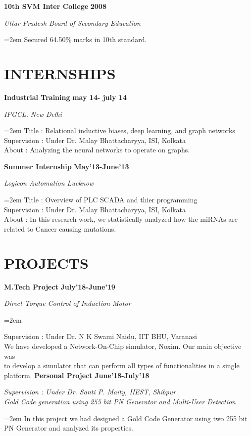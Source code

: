 \documentclass[paper=a4,fontsize=11pt]{scrartcl} %
\newcommand{\sepspace}{\vspace*{1em}}		%
\newcommand{\NewPart}[1]{\section*{\uppercase{#1}}}
\newcommand{\EducationEntry}[4]{
		\noindent \textbf{#1} \hfill      %
		\textbf{#2} \par  %
		\noindent \textit{#3} \par        %
		\noindent\hangindent=2em\hangafter=0 \small #4 %
		\normalsize \par}
\newcommand{\WorkEntry}[4]{				  %
		\noindent \textbf{#1} \hfill      %
		\textbf{#2} \par  %
		\noindent \textit{#3} \par              %
		\noindent\hangindent=2em\hangafter=0 \small #4 %
		\normalsize \par}
\begin{document}
            \EducationEntry{10th SVM Inter College}{2008}{Uttar Pradesh Board of
            Secondary Education}{Secured 64.50\% marks in 10th standard.}

    \NewPart{Internships}
{}
           \WorkEntry{Industrial Training} %
           {may 14- july 14} %
           {IPGCL, New Delhi} %
           {
            Title : Relational inductive biases, deep learning, and graph networks\\Supervision : Under Dr. Malay Bhattacharyya, ISI, Kolkata\\About : Analyzing the neural networks to operate on graphs.%
           }
    \sepspace
             \sepspace
    \WorkEntry{Summer Internship}{May'13-June'13}{Logicon Automation Lucknow}{Title : Overview of PLC SCADA and thier programming\\Supervision : Under Dr. Malay Bhattacharyya, ISI, Kolkata\\About : In this research work, we statistically analyzed how the miRNAs are related to Cancer causing
    mutations.}    

\NewPart{Projects}{}

        \WorkEntry{M.Tech Project} %
        {July'18-June'19} %
        {
            Direct Torque Control of Induction Motor %
        }
        \sepspace
    {Supervision : Under Dr. N K Swami Naidu, IIT BHU, Varanasi\\We have developed a Network-On-Chip simulator, Noxim. Our main objective was \\to develop a simulator that can perform all types of functionalities in a single platform.}
    \WorkEntry{Personal Project}{June'18-July'18}{Supervision : Under Dr. Santi P. Maity, IIEST, Shibpur\\Gold Code generation using 255 bit PN Generator and Multi-User Detection}{In this project we had designed a Gold Code Generator using two 255 bit PN Generator and analyzed its
    properties.}
    \sepspace
\end{document}
